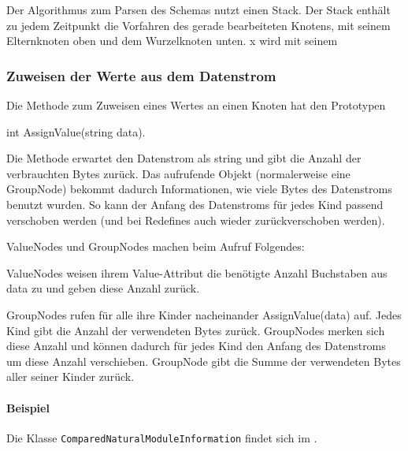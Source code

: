 Der Algorithmus zum Parsen des Schemas nutzt einen Stack. Der Stack enthält zu jedem Zeitpunkt die Vorfahren des gerade bearbeiteten Knotens, mit seinem Elternknoten oben und dem Wurzelknoten unten. x wird mit seinem



\subsubsection{Zuweisen der Werte aus dem Datenstrom}
Die Methode zum Zuweisen eines Wertes an einen Knoten hat den Prototypen 

int AssignValue(string data).

Die Methode erwartet den Datenstrom als string und gibt die Anzahl der verbrauchten Bytes zurück. Das aufrufende Objekt (normalerweise eine GroupNode) bekommt dadurch Informationen, wie viele Bytes des Datenstroms benutzt wurden. So kann der Anfang des Datenstroms für jedes Kind passend verschoben werden (und bei Redefines auch wieder zurückverschoben werden).

ValueNodes und GroupNodes machen beim Aufruf Folgendes:

ValueNodes weisen ihrem Value-Attribut die benötigte Anzahl Buchstaben aus data zu und geben diese Anzahl zurück.


GroupNodes rufen für alle ihre Kinder nacheinander AssignValue(data) auf. Jedes Kind gibt die Anzahl der verwendeten Bytes zurück. GroupNodes merken sich diese Anzahl und können dadurch für jedes Kind den Anfang des Datenstroms um diese Anzahl verschieben. GroupNode gibt die Summe der verwendeten Bytes aller seiner Kinder zurück.

\paragraph{Beispiel}
Die Klasse \texttt{Com\-par\-ed\-Na\-tu\-ral\-Mo\-dule\-In\-for\-ma\-tion} findet sich im .  






